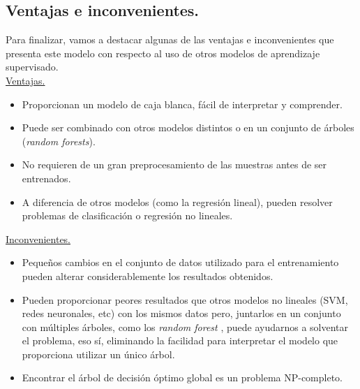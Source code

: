 \subsection{Ventajas e inconvenientes.}
Para finalizar, vamos a destacar algunas de las ventajas e inconvenientes que presenta este modelo con respecto al uso de otros modelos de aprendizaje supervisado.\\

\underline{Ventajas.}\\
\begin{itemize}
	\item Proporcionan un modelo de caja blanca, fácil de interpretar y comprender.
	\item Puede ser combinado con otros modelos distintos o en un conjunto de árboles (\textit{random forests}).
	\item No requieren de un gran preprocesamiento de las muestras antes de ser entrenados.
	\item A diferencia de otros modelos (como la regresión lineal), pueden resolver problemas de clasificación o regresión no lineales.\\
\end{itemize}

\underline{Inconvenientes.}\\
\begin{itemize}
	\item Pequeños cambios en el conjunto de datos utilizado para el entrenamiento pueden alterar considerablemente los resultados obtenidos.
	\item Pueden proporcionar peores resultados que otros modelos no lineales (SVM, redes neuronales, etc) con los mismos datos pero, juntarlos en un conjunto con múltiples árboles, como los \textit{random forest} \cite{randomforest}, puede ayudarnos a solventar el problema, eso sí, eliminando la facilidad para interpretar el modelo que proporciona utilizar un único árbol.
	\item Encontrar el árbol de decisión óptimo global es un problema NP-completo.
\end{itemize}